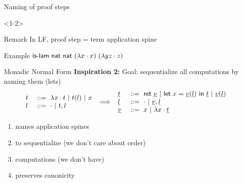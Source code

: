 \documentclass[ignorenonframetext,red]{beamer}
\begin{document}
\begin{frame}{Naming of proof steps}
  \begin{onlyenv}<1-2>
    \begin{block}{Remark}
      In LF, proof step = term application spine

      \textcolor{green!50!black}{Example} $ \text{\textsf{is-lam}}\
      \mathsf{nat}\ \mathsf{nat}\ (\lambda{x}\cdot x)\ (\lambda{y z}\cdot z) $
    \end{block}
    \pause
    \begin{block}{Monadic Normal Form}
      \textbf{Inspiration 2:} Goal: sequentialize all computations by naming them
      (\textsf{let}s)
      \[
      \inXLF
      \begin{array}{ll}
        \mo &\gequal \ulam\mv\mo \gor \lapp\mo\ma \gor \mv \\
        \ma &\gequal \lnil \gor \lcons\mo\ma \\
      \end{array}
      \ \Longrightarrow\ \inXLFa
      \begin{array}{ll}
        \mo &\gequal \ret\mval \gor \letb\mv{\lapp\mval\ma}\mo \gor \lapp\mval\ma \\
        \ma &\gequal \lnil \gor \lcons\mval\ma \\
        \mval &\gequal \mv \gor \ulam\mv\mo
      \end{array}
      \]
    \end{block}
    \begin{enumerate}
    \item[\itplus] names application spines
    \item[\itminus] to sequentialize (we don't care about order)
    \item[\itminus] computations (we don't have)
    \item[\itplus] preserves canonicity
    \end{enumerate}

\end{onlyenv}
\end{frame}
\end{document}
